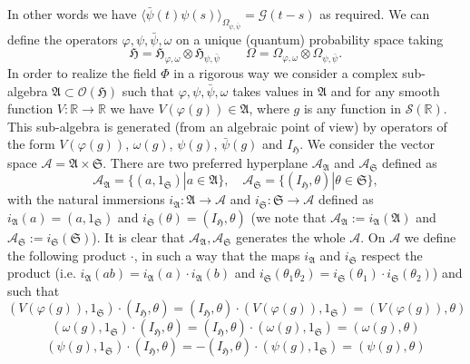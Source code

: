 \documentclass[a4paper,10pt]{article}
\newcommand{\assign}{:=}
\newcommand{\comma}{{,}}
\begin{document}
In other words we have $\langle \bar{\psi} (t) \psi (s) \rangle_{\Omega_{\psi,
\bar{\psi}}} = \mathcal{G} (t - s)$ as required. We can define the operators
$\varphi, \psi, \bar{\psi}, \omega$ on a unique (quantum) probability space
taking
\[ \mathfrak{H}=\mathfrak{H}_{\varphi, \omega} \otimes \mathfrak{H}_{\psi
   \comma \bar{\psi}} \qquad \Omega = \Omega_{\varphi, \omega} \otimes
   \Omega_{\psi, \bar{\psi}} . \]
In order to realize the field $\Phi$ in a rigorous way we consider a complex
sub-algebra $\mathfrak{A} \subset \mathcal{O} (\mathfrak{H})$ such that
$\varphi, \psi, \bar{\psi}, \omega$ takes values in $\mathfrak{A}$ and for any
smooth function $V : \mathbb{R} \rightarrow \mathbb{R}$ we have $V (\varphi
(g)) \in \mathfrak{A}$, where $g$ is any function in $\mathcal{S}
(\mathbb{R})$. This sub-algebra is generated (from an algebraic point of view)
by operators of the form $V (\varphi (g))$, $\omega (g)$, $\psi (g)$,
$\bar{\psi} (g)$ and $I_{\mathfrak{H}}$. We consider the vector space
$\mathcal{A} = \mathfrak{A} \times \mathfrak{S}$. There are two preferred
hyperplane $\mathcal{A}_{\mathfrak{A}}$ and $\mathcal{A}_{\mathfrak{S}}$
defined as
\[ \mathcal{A}_{\mathfrak{A}} = \{ (a, 1_{\mathfrak{S}}) |a \in \mathfrak{A}
   \}, \quad \mathcal{A}_{\mathfrak{S}} = \{ (I_{\mathfrak{H}}, \theta) |
   \theta \in \mathfrak{S} \}, \]
with the natural immersions $i_{\mathfrak{A}} : \mathfrak{A} \rightarrow
\mathcal{A}$ and $i_{\mathfrak{S}} : \mathfrak{S \rightarrow} \mathcal{A}$
defined as $i_{\mathfrak{A}} (a) = (a, 1_{\mathfrak{S}})$ and
$i_{\mathfrak{S}} (\theta) = (I_{\mathfrak{H}}, \theta)$ (we note that
$\mathcal{A}_{\mathfrak{A}} \assign i_{\mathfrak{A}} (\mathfrak{A})$ and
$\mathcal{A}_{\mathfrak{S}} \assign i_{\mathfrak{S}} (\mathfrak{S})$). It is
clear that $\mathcal{A}_{\mathfrak{A}}, \mathcal{A}_{\mathfrak{S}}$ generates
the whole $\mathcal{A}$. On $\mathcal{A}$ we define the following product
$\cdot$, in such a way that the maps $i_{\mathfrak{A}}$ and $i_{\mathfrak{S}}$
respect the product (i.e. $i_{\mathfrak{A}} (a b) = i_{\mathfrak{A}} (a) \cdot
i_{\mathfrak{A}} (b)$ and $i_{\mathfrak{S}} (\theta_1 \theta_2) =
i_{\mathfrak{S}} (\theta_1) \cdot i_{\mathfrak{S}} (\theta_2)$) and such that
\[ (V (\varphi (g)), 1_{\mathfrak{S}}) \cdot (I_{\mathfrak{H}}, \theta) =
   (I_{\mathfrak{H}}, \theta) \cdot (V (\varphi (g)), 1_{\mathfrak{S}}) = (V
   (\varphi (g)), \theta) \]
\[ (\omega (g), 1_{\mathfrak{S}}) \cdot (I_{\mathfrak{H}}, \theta) =
   (I_{\mathfrak{H}}, \theta) \cdot (\omega (g), 1_{\mathfrak{S}}) = (\omega
   (g), \theta) \]
\[ (\psi (g), 1_{\mathfrak{S}}) \cdot (I_{\mathfrak{H}}, \theta) = -
   (I_{\mathfrak{H}}, \theta) \cdot (\psi (g), 1_{\mathfrak{S}}) = (\psi (g),
   \theta) \]
\end{document}
